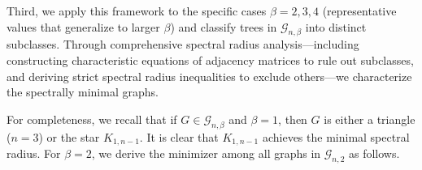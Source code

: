 \documentclass[12pt]{amsart}
\begin{document}
Third, we apply this framework to the specific cases \( \beta = 2, 3, 4 \) (representative values that generalize to larger \( \beta \)) and classify trees in \( \mathcal{G}_{n,\beta} \) into distinct subclasses. Through comprehensive spectral radius analysis—including constructing characteristic equations of adjacency matrices to rule out subclasses, and deriving strict spectral radius inequalities to exclude others—we characterize the spectrally minimal graphs. 

For completeness, we recall that if \( G \in \mathcal{G}_{n,\beta} \) and \( \beta = 1 \), then \( G \) is either a triangle (\( n = 3 \)) or the star \( K_{1,n-1} \). It is clear that \( K_{1,n-1} \) achieves the minimal spectral radius. For \( \beta = 2 \), we derive the minimizer among all graphs in \( \mathcal{G}_{n,2} \) as follows.
\end{document}
